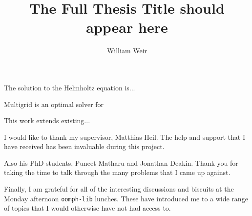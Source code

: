 \title{The Full Thesis Title should appear here}
\author{William Weir}
\def\wordcount{xxxxx}

\tablespagefalse



\beforeabstract


The solution to the Helmholtz equation is... 

Multigrid is an optimal solver for 

This work extends existing...

\afterabstract


I would like to thank my supervisor, Matthias Heil.
The help and support that I have received has been invaluable during this project.

Also his PhD students, Puneet Matharu and Jonathan Deakin.
Thank you for taking the time to talk through the many problems that I came up against.

Finally, I am grateful for all of the interesting discussions and biscuits at the Monday afternoon \texttt{oomph-lib} lunches.
These have introduced me to a wide range of topics that I would otherwise have not had access to.

